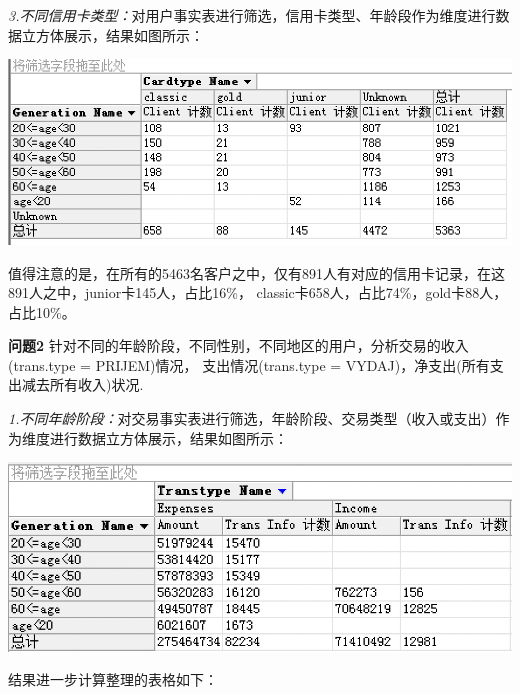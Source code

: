 \documentclass[a4paper]{article}
\begin{document}
\begin{enumerate}
  \textit{3.不同信用卡类型：}对用户事实表进行筛选，信用卡类型、年龄段作为维度进行数据立方体展示，结果如图所示：
  \begin{center}
    \includegraphics[scale=0.6]{Pictures/CARDTYPE}
  \end{center}
  值得注意的是，在所有的5463名客户之中，仅有891人有对应的信用卡记录，在这891人之中，junior卡145人，占比16\%，
  classic卡658人，占比74\%，gold卡88人，占比10\%。

  \textbf{问题2} 针对不同的年龄阶段，不同性别，不同地区的用户，分析交易的收入(trans.type = PRIJEM)情况，
  支出情况(trans.type = VYDAJ)，净支出(所有支出减去所有收入)状况.

  \textit{1.不同年龄阶段：}对交易事实表进行筛选，年龄阶段、交易类型（收入或支出）作为维度进行数据立方体展示，结果如图所示：
  \begin{center}
    \includegraphics[scale=0.6]{Pictures/GENTR}
  \end{center}
  结果进一步计算整理的表格如下：
  \begin{center}
  \end{center}


\end{enumerate}
\end{document}
